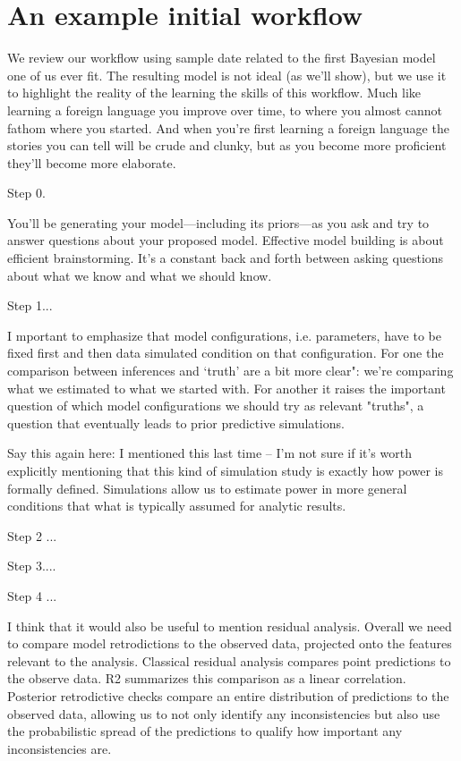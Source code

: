 \documentclass[11pt]{article}
\begin{document}
\section{An example initial workflow}

We review our workflow using sample date related to the first Bayesian model one of us ever fit. The resulting model is not ideal (as we'll show), but we use it to highlight the reality of the learning the skills of this workflow. Much like learning a foreign language you improve over time, to where you almost cannot fathom where you started. And when you're first learning a foreign language the stories you can tell will be crude and  clunky, but as you become more proficient they'll become more elaborate.


Step 0.

You’ll be generating your model---including its priors---as you ask and try to answer questions about your proposed model. Effective model building is about efficient brainstorming.  It's a constant back and forth between asking
questions about what we know and what we should know.

Step 1... 

I mportant to emphasize that model configurations, i.e. parameters, have to be fixed first and then data simulated condition on that configuration.  For one the comparison between inferences and `truth' are a bit more clear": we're comparing what we estimated to what we started with.  For another it raises the important question of which model configurations we should try as relevant "truths", a question that eventually leads to prior predictive simulations.

Say this again here: I mentioned this last time -- I'm not sure if it's worth explicitly mentioning that this kind of simulation study is
exactly how power is formally defined.  Simulations allow us to estimate power in more general conditions that what is
typically assumed for analytic results.

Step 2 ...

Step 3....

Step 4 ...

I think that it would also be useful to mention residual analysis. Overall we need to compare model retrodictions to the observed data, projected onto the features relevant to the analysis. Classical residual analysis compares point predictions to the observe data. R2 summarizes this comparison as a linear correlation. Posterior retrodictive checks compare an entire distribution of predictions to the observed data, allowing us to not only identify any inconsistencies but also use the probabilistic spread of the predictions to qualify how important any inconsistencies are.
\end{document}
